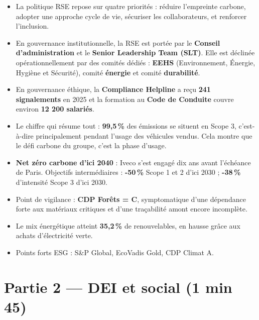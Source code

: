 \documentclass[12pt,a4paper]{article}
\begin{document}
\begin{itemize}
  \item La politique RSE repose sur quatre priorités : réduire l'empreinte carbone, adopter une approche cycle de vie, sécuriser les collaborateurs, et renforcer l'inclusion.
  \item En gouvernance institutionnelle, la RSE est portée par le \textbf{Conseil d'administration} et le \textbf{Senior Leadership Team (SLT)}. Elle est déclinée opérationnellement par des comités dédiés : \textbf{EEHS} (Environnement, Énergie, Hygiène et Sécurité), comité \textbf{énergie} et comité \textbf{durabilité}.
  \item En gouvernance éthique, la \textbf{Compliance Helpline} a reçu \textbf{241 signalements} en 2025 et la formation au \textbf{Code de Conduite} couvre environ \textbf{12 200 salariés}.
  \item Le chiffre qui résume tout : \textbf{99,5\,\%} des émissions se situent en Scope 3, c'est-à-dire principalement pendant l'usage des véhicules vendus. Cela montre que le défi carbone du groupe, c'est la phase d'usage.
  \item \textbf{Net zéro carbone d'ici 2040} : Iveco s'est engagé dix ans avant l'échéance de Paris. Objectifs intermédiaires : \textbf{-50\,\%} Scope 1 et 2 d'ici 2030 ; \textbf{-38\,\%} d'intensité Scope 3 d'ici 2030.
  \item Point de vigilance : \textbf{CDP Forêts = C}, symptomatique d'une dépendance forte aux matériaux critiques et d'une traçabilité amont encore incomplète.
  \item Le mix énergétique atteint \textbf{35,2\,\%} de renouvelables, en hausse grâce aux achats d'électricité verte.
  \item Points forts ESG : S\&P Global, EcoVadis Gold, CDP Climat A.
\end{itemize}

\section*{Partie 2 --- DEI et social (1 min 45)}
\end{document}
